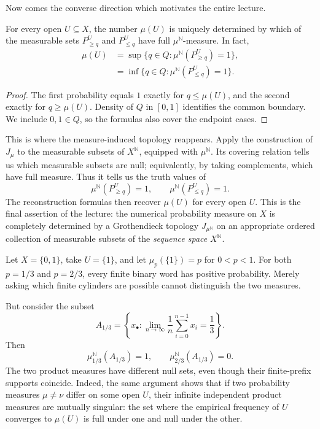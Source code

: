 Now comes the converse direction which motivates the entire lecture.

\begin{proposition}
For every open \(U\subseteq X\), the number \(\mu(U)\) is uniquely determined by which of the measurable sets \(P_{\geq q}^U\) and \(P_{\leq q}^U\) have full \(\mu^{\mathbb N}\)-measure. In fact,
\begin{align}
 \mu(U)
 &=\sup\{q\in Q:\mu^{\mathbb N}(P_{\geq q}^U)=1\},\label{eq:N20261026-recover-sup}\\
 &=\inf\{q\in Q:\mu^{\mathbb N}(P_{\leq q}^U)=1\}.\label{eq:N20261026-recover-inf}
\end{align}
\end{proposition}
\begin{proof}
The first probability equals \(1\) exactly for \(q\leq\mu(U)\), and the second exactly for \(q\geq\mu(U)\). Density of \(Q\) in \([0,1]\) identifies the common boundary. We include \(0,1\in Q\), so the formulas also cover the endpoint cases.
\end{proof}

This is where the measure-induced topology reappears. Apply the construction of \(J_\mu\) to the measurable subsets of \(X^{\mathbb N}\), equipped with \(\mu^{\mathbb N}\). Its covering relation tells us which measurable subsets are null; equivalently, by taking complements, which have full measure. Thus it tells us the truth values of
\[
 \mu^{\mathbb N}(P_{\geq q}^U)=1,
 \qquad
 \mu^{\mathbb N}(P_{\leq q}^U)=1.
\]
The reconstruction formulas then recover \(\mu(U)\) for every open \(U\). This is the final assertion of the lecture: the numerical probability measure on \(X\) is completely determined by a Grothendieck topology \(J_{\mu^{\mathbb N}}\) on an appropriate ordered collection of measurable subsets of the \emph{sequence space} \(X^{\mathbb N}\).

\begin{example}
Let \(X=\{0,1\}\), take \(U=\{1\}\), and let \(\mu_p(\{1\})=p\) for \(0<p<1\). For both \(p=1/3\) and \(p=2/3\), every finite binary word has positive probability. Merely asking which finite cylinders are possible cannot distinguish the two measures.

But consider the subset
\[
 A_{1/3}=\left\{x_\bullet:
 \lim_{n\to\infty}\frac1n\sum_{i=0}^{n-1}x_i=\frac13\right\}.
\]
Then
\[
 \mu_{1/3}^{\mathbb N}(A_{1/3})=1,
 \qquad
 \mu_{2/3}^{\mathbb N}(A_{1/3})=0.
\]
The two product measures have different null sets, even though their finite-prefix supports coincide. Indeed, the same argument shows that if two probability measures \(\mu\ne\nu\) differ on some open \(U\), their infinite independent product measures are mutually singular: the set where the empirical frequency of \(U\) converges to \(\mu(U)\) is full under one and null under the other.
\end{example}

